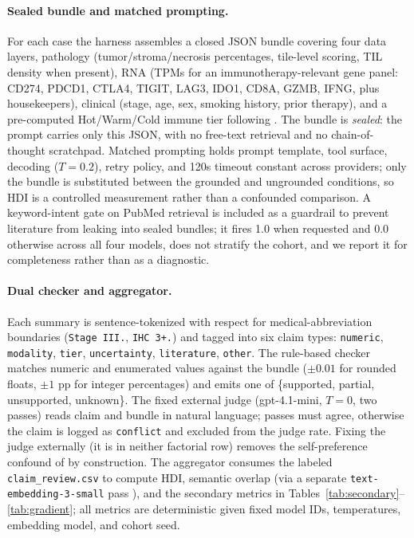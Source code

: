 \documentclass{article}
\theoremstyle{plain}
\begin{document}
\paragraph{Sealed bundle and matched prompting.}
For each case the harness assembles a closed JSON bundle covering four data layers, pathology (tumor/stroma/necrosis percentages, tile-level scoring, TIL density when present), RNA (TPMs for an immunotherapy-relevant gene panel: CD274, PDCD1, CTLA4, TIGIT, LAG3, IDO1, CD8A, GZMB, IFNG, plus housekeepers), clinical (stage, age, sex, smoking history, prior therapy), and a pre-computed Hot/Warm/Cold immune tier following \citet{thorsson2018immune}. The bundle is \emph{sealed}: the prompt carries only this JSON, with no free-text retrieval and no chain-of-thought scratchpad. Matched prompting holds prompt template, tool surface, decoding ($T{=}0.2$), retry policy, and 120s timeout constant across providers; only the bundle is substituted between the grounded and ungrounded conditions, so HDI is a controlled measurement rather than a confounded comparison. A keyword-intent gate on PubMed retrieval is included as a guardrail to prevent literature from leaking into sealed bundles; it fires 1.0 when requested and 0.0 otherwise across all four models, does not stratify the cohort, and we report it for completeness rather than as a diagnostic.

\paragraph{Dual checker and aggregator.}
Each summary is sentence-tokenized with respect for medical-abbreviation boundaries (\texttt{Stage III.}, \texttt{IHC 3+.}) and tagged into six claim types: \texttt{numeric}, \texttt{modality}, \texttt{tier}, \texttt{uncertainty}, \texttt{literature}, \texttt{other}. The rule-based checker matches numeric and enumerated values against the bundle ($\pm 0.01$ for rounded floats, $\pm 1$ pp for integer percentages) and emits one of \{supported, partial, unsupported, unknown\}. The fixed external judge (gpt-4.1-mini, $T{=}0$, two passes) reads claim and bundle in natural language; passes must agree, otherwise the claim is logged as \texttt{conflict} and excluded from the judge rate. Fixing the judge externally (it is in neither factorial row) removes the self-preference confound of \citet{panickssery2024llm} by construction. The aggregator consumes the labeled \texttt{claim\_review.csv} to compute HDI, semantic overlap (via a separate \texttt{text-embedding-3-small} pass \citep{openai2024embeddings}), and the secondary metrics in Tables~\ref{tab:secondary}--\ref{tab:gradient}; all metrics are deterministic given fixed model IDs, temperatures, embedding model, and cohort seed.
\end{document}
